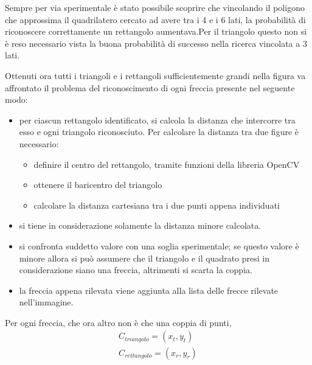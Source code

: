 Sempre per via sperimentale è stato possibile scoprire che vincolando il poligono che approssima il quadrilatero cercato ad avere tra i 4 e i 6 lati, la probabilità di riconoscere correttamente un rettangolo aumentava.Per il triangolo questo non si è reso necessario vista la buona probabilità di successo nella ricerca vincolata a 3 lati.

Ottenuti ora tutti i triangoli e i rettangoli sufficientemente grandi nella figura va affrontato il problema del riconoscimento di ogni freccia presente nel seguente modo:
\begin{itemize}
	\item \textbf{} per ciascun rettangolo identificato, si calcola la distanza che intercorre tra esso e ogni triangolo riconosciuto. Per calcolare la distanza tra due figure è necessario:
	\begin{itemize}
		\item \textbf{}definire il centro del rettangolo, tramite funzioni della libreria OpenCV
		\item \textbf{}ottenere il baricentro del triangolo
		\item \textbf{}calcolare la distanza cartesiana tra i due punti appena individuati
	\end{itemize}
	\item \textbf{} si tiene in considerazione solamente la distanza minore calcolata.
	\item \textbf{} si confronta suddetto valore con una soglia sperimentale; se questo valore è minore allora si può assumere che il triangolo e il quadrato presi in considerazione siano una freccia, altrimenti si scarta la coppia.
	\item \textbf{} la freccia appena rilevata viene aggiunta alla lista delle frecce rilevate nell'immagine.
\end{itemize}
Per ogni freccia, che ora altro non è che una coppia di punti,
\begin{equation}
	\begin{split}
		C_{triangolo}=(x_t,y_t)\\ 
		C_{rettangolo}=(x_r,y_r)
	\end{split}
\end{equation}

